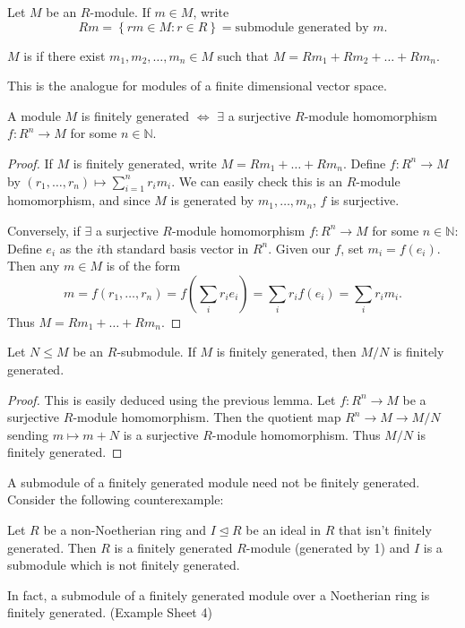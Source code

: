 \documentclass[egregdoesnotlikesansseriftitles,a4paper]{scrartcl}
\begin{document}
Let $M$ be an $R$-module. If $m\in M$, write \[
Rm = \left\{rm \in M: r \in R\right\}=\text{submodule generated by } m
.\] 
\begin{definition*}
       $M$ is  if there exist $m_1 ,m_2 , \ldots, m_n \in M$ such that $M=Rm_1 +Rm_2+\ldots +Rm_n$.
       \begin{remark}
              This is the analogue for modules of a finite dimensional vector space.
       \end{remark}
\end{definition*}
\begin{lemma}\label{lem143}
      A module $M$ is finitely generated $\iff$ $\exists$ a surjective $R$-module homomorphism $f: R^{n}\rightarrow M$ for some $n \in \mathbb{N}$. 
      \begin{proof}
             If $M$ is finitely generated, write $M=R m_1 +\ldots+ Rm_n$. Define $f: R^{n}\rightarrow M$ by $(r_1 ,\ldots, r_n)\mapsto \sum_{i=1}^{n}r_{i}m_{i}$. We can easily check this is an $R$-module homomorphism, and since $M$ is generated by $m_1 ,\ldots,m_n$, $f$ is surjective.

             Conversely, if $\exists$ a surjective $R$-module homomorphism $f: R^{n}\rightarrow M$ for some $n \in \mathbb{N}$: Define $e_{i}$ as the $i$th standard basis vector in $R^{n}$. Given our $f$, set $m_i= f (e_i)$. Then any $m \in M$ is of the form \[
             m= f (r_1 , \ldots, r_n )=f (\sum_{i}^{}r_{i}e_{i})=\sum_{i}^{}r_{i}f (e_{i})=\sum_{i}^{}r_{i}m_{i}
             .\] Thus $M=R m_1 +\ldots+ Rm_n$.
      \end{proof}
\end{lemma}
\begin{corollary}
       Let $N \leq M$ be an $R$-submodule. If $M$ is finitely generated, then $M/N$ is finitely generated.
       \begin{proof}
              This is easily deduced using the previous lemma. Let $f: R^{n} \rightarrow M$ be a surjective $R$-module homomorphism. Then the quotient map $R^{n}\rightarrow M \rightarrow M/N$ sending $m \mapsto m+N$ is a surjective $R$-module homomorphism. Thus $M/N$ is finitely generated.
       \end{proof}
\end{corollary}
\begin{remark}
       A submodule of a finitely generated module need not be finitely generated. Consider the following counterexample:

       Let $R$ be a non-Noetherian ring and $I \unlhd R$ be an ideal in $R$ that isn't finitely generated. Then $R$ is a finitely generated $R$-module (generated by 1) and $I$ is a submodule which is not finitely generated.

       In fact, a submodule of a finitely generated module over a Noetherian ring is finitely generated. (Example Sheet 4)
\end{remark}
\end{document}
